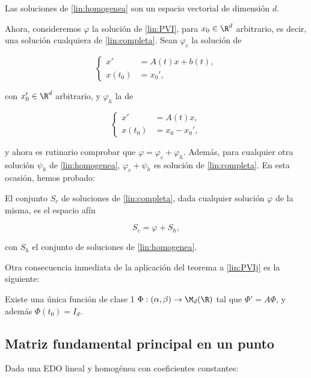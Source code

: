\begin{ncor}
  Las soluciones de \eqref{lin:homogenea} son un espacio vectorial de dimensión $d$.
\end{ncor}

Ahora, consideremos $\varphi$ la solución de \eqref{lin:PVI}, para $x_0\in\R^d$ arbitrario, es decir, una solución cualquiera de \eqref{lin:completa}.
Sean $\varphi_c$ la solución de

\begin{equation}
\left\{\begin{array}{rl}
x' &=A(t)x+b(t), \\
x(t_0)&=x_0',
\end{array}\right.
\end{equation}

con $x_0'\in\R^d$ arbitrario, y $\varphi_h$ la de

\begin{equation}
\left\{\begin{array}{rl}
x' &=A(t)x, \\
x(t_0)&=x_0 - x_0',
\end{array}\right.
\end{equation}

y ahora es rutinario comprobar que $\varphi = \varphi_c + \varphi_h$. Además, para cualquier otra solución $\psi_{h}$ de \eqref{lin:homogenea}, $\varphi_c + \psi_h$
es solución de \eqref{lin:completa}.
En esta ocasión, hemos probado:

\begin{ncor}
  El conjunto $S_c$ de soluciones de \eqref{lin:completa}, dada cualquier solución $\varphi$ de la misma, es el espacio afín

  \[
    S_c = \varphi + S_h,
    \]

    con $S_h$ el conjunto de soluciones de \eqref{lin:homogenea}.
\end{ncor}

Otra consecuencia inmediata de la aplicación del teorema a \ref{lin:PVIj} es la siguiente:

\begin{ncor} \label{lin:cormfp}
  Existe una única función de clase 1 $\Phi: (\alpha, \beta) \to \M_d(\R)$ tal que $\Phi' = A\Phi$, y
  además $\Phi(t_0) = I_d$.
\end{ncor}

\subsection{Matriz fundamental principal en un punto}
Dada una EDO lineal y homogénea con coeficientes constantes:

